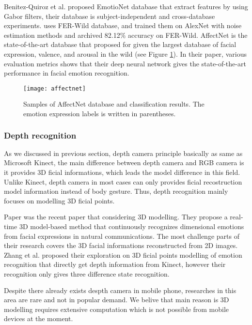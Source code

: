 Benitez-Quiroz et al. \cite{fabian2016emotionet} proposed EmotioNet database that extract features by using Gabor filters, their database is subject-independent and cross-database experiments.
\cite{mollahosseini2016facial} uses FER-Wild database, and trained them on AlexNet with noise estimation methods and archived 82.12\% accuracy on FER-Wild. 
AffectNet \cite{Mollahosseini2017} is the state-of-the-art database that proposed for given the largest database of facial expression, valence, and arousal in the wild (see Figure \ref{fig:affectnet}). In their paper, various evaluation metrics shows that their deep neural network gives the state-of-the-art performance in facial emotion recognition.

\begin{figure}
  \centering
  \texttt{[image: affectnet]}
  \caption{Samples of AffectNet database and classification results. The emotion expression labels is written in parentheses.}
  \label{fig:affectnet}
\end{figure}

\subsubsection{Depth recognition}

As we discussed in previous section, depth camera principle basically as same as Microsoft Kinect, the main difference between depth camera and RGB camera is it provides 3D ficial informations, which leads the model difference in this field. Unlike Kinect, depth camera in most cases can only provides ficial recostruction model information instead of body gesture. Thus, depth recognition mainly focuses on modelling 3D ficial points. 

Paper \cite{chen20153d} was the recent paper that considering 3D modelling. They propose a real-time 3D model-based method that continuously recognizes dimensional emotions from facial expressions in natural communications. The most challenge parts of their research covers the 3D facial informations reconstructed from 2D images. Zhang et al. \cite{zhang2016emotion} proposed their exploration on 3D ficial points modelling of emotion recognition that directly get depth information from Kinect, however their recognition only gives three difference state recognition.

Despite there already exists despth camera in mobile phone, researches in this area are rare and not in popular demand. We belive that main reason is 3D modelling requires extensive computation which is not possible from mobile devices at the moment.

